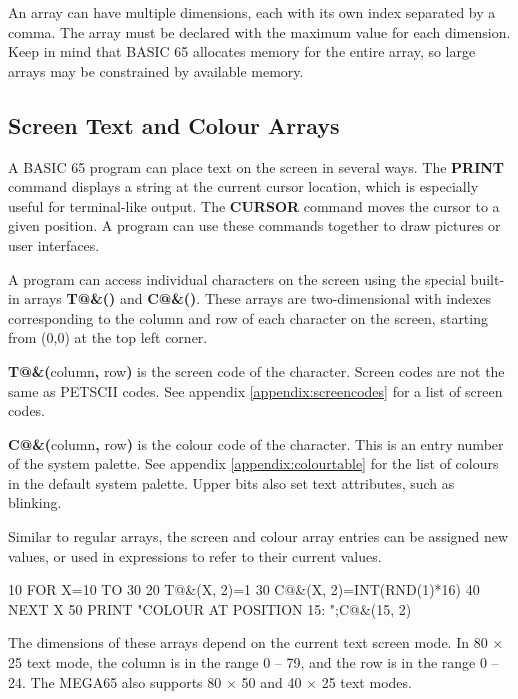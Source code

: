 An array can have multiple dimensions, each with its own index separated by a comma. The array must be declared with the maximum value for each dimension. Keep in mind that BASIC 65 allocates memory for the entire array, so large arrays may be constrained by available memory.


\subsection{Screen Text and Colour Arrays}
\label{sec:screentextandcolourarrays}

A BASIC 65 program can place text on the screen in several ways. The {\bf PRINT} command displays a string at the current cursor location, which is especially useful for terminal-like output. The {\bf CURSOR} command moves the cursor to a given position. A program can use these commands together to draw pictures or user interfaces.

A program can access individual characters on the screen using the special built-in arrays \textbf{T@\&()} and \textbf{C@\&()}. These arrays are two-dimensional with indexes corresponding to the column and row of each character on the screen, starting from (0,0) at the top left corner.

\textbf{T@\&(}column{\bf ,} row{\bf )} is the screen code of the character. Screen codes are not the same as PETSCII codes. See appendix \vref{appendix:screencodes} for a list of screen codes.

\textbf{C@\&(}column{\bf ,} row{\bf )} is the colour code of the character. This is an entry number of the system palette. See appendix \vref{appendix:colourtable} for the list of colours in the default system palette. Upper bits also set text attributes, such as blinking.

Similar to regular arrays, the screen and colour array entries can be assigned new values, or used in expressions to refer to their current values.

\begin{screencode}
10 FOR X=10 TO 30
20 T@&(X, 2)=1
30 C@&(X, 2)=INT(RND(1)*16)
40 NEXT X
50 PRINT "COLOUR AT POSITION 15: ";C@&(15, 2)
\end{screencode}

The dimensions of these arrays depend on the current text screen mode. In 80 $\times$ 25 text mode, the column is in the range 0 -- 79, and the row is in the range 0 -- 24. The MEGA65 also supports 80 $\times$ 50 and 40 $\times$ 25 text modes.


